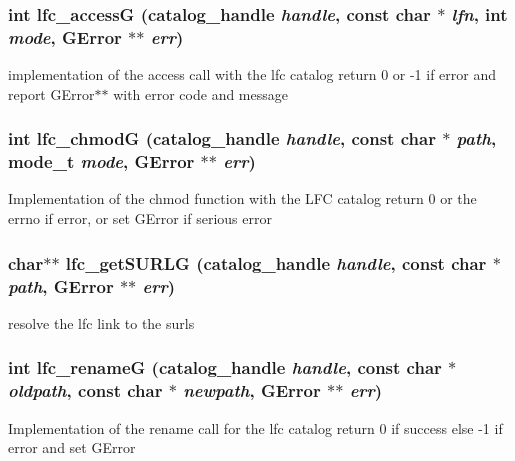 \subsubsection{\setlength{\rightskip}{0pt plus 5cm}int lfc\_\-access\-G (catalog\_\-handle {\em handle}, const char $\ast$ {\em lfn}, int {\em mode}, GError $\ast$$\ast$ {\em err})}\label{gfal__common__lfc_8c_c5d7bae3ad9aea9f912d6b91f8d5731e}


implementation of the access call with the lfc catalog return 0 or -1 if error and report GError$\ast$$\ast$ with error code and message 
\subsubsection{\setlength{\rightskip}{0pt plus 5cm}int lfc\_\-chmod\-G (catalog\_\-handle {\em handle}, const char $\ast$ {\em path}, mode\_\-t {\em mode}, GError $\ast$$\ast$ {\em err})}\label{gfal__common__lfc_8c_f40927feaad58de76b5406eb828102a6}


Implementation of the chmod function with the LFC catalog return 0 or the errno if error, or set GError if serious error 
\subsubsection{\setlength{\rightskip}{0pt plus 5cm}char$\ast$$\ast$ lfc\_\-get\-SURLG (catalog\_\-handle {\em handle}, const char $\ast$ {\em path}, GError $\ast$$\ast$ {\em err})}\label{gfal__common__lfc_8c_7c1d8699d8ad924234db163860dadf40}


resolve the lfc link to the surls 
\subsubsection{\setlength{\rightskip}{0pt plus 5cm}int lfc\_\-rename\-G (catalog\_\-handle {\em handle}, const char $\ast$ {\em oldpath}, const char $\ast$ {\em newpath}, GError $\ast$$\ast$ {\em err})}\label{gfal__common__lfc_8c_cb750f4f936abd772a5f53f5b1fbdaec}


Implementation of the rename call for the lfc catalog return 0 if success else -1 if error and set GError 
